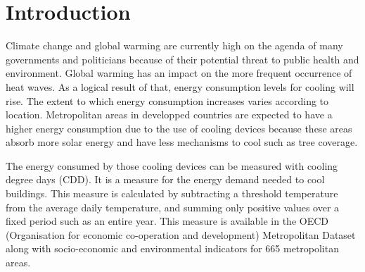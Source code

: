 \documentclass[fleqn,10pt]{SelfArx} %
\affiliation{\textsuperscript{1}\textit{Faculty of Science,  Master of Statistics and Data Science, KU Leuven, Leuven, Belgium}} %
\affiliation{*\textit{Team coordinator}} %
\begin{document}
\maketitle %


\thispagestyle{empty} %


\section*{Introduction} %


Climate change and global warming are currently high on the agenda of many governments and politicians because of their potential threat to public health and environment.  Global warming has an impact on the more frequent occurrence of heat waves\cite{BaldwinJaneWilson2019TCHW}.
As a logical result of that, energy consumption levels for cooling will rise.  The extent to which energy consumption increases varies according to location.  Metropolitan areas in developped countries are expected to have a higher energy consumption due to the use of cooling devices \cite{SivakMichael2009Pedf} because these areas absorb more solar energy and have less mechanisms to cool such as tree coverage\cite{SmidM2019REcb}.  

The energy consumed by those cooling devices can be measured with cooling degree days (CDD). It is a measure for the energy demand needed to cool buildings. This measure is calculated by subtracting a threshold temperature from the average daily temperature, and summing only positive values over a fixed period such as an entire year.  This measure is available in the OECD (Organisation for economic co-operation and development) Metropolitan Dataset along with socio-economic and environmental indicators for 665 metropolitan areas\cite{OECDmetro}.
\end{document}

